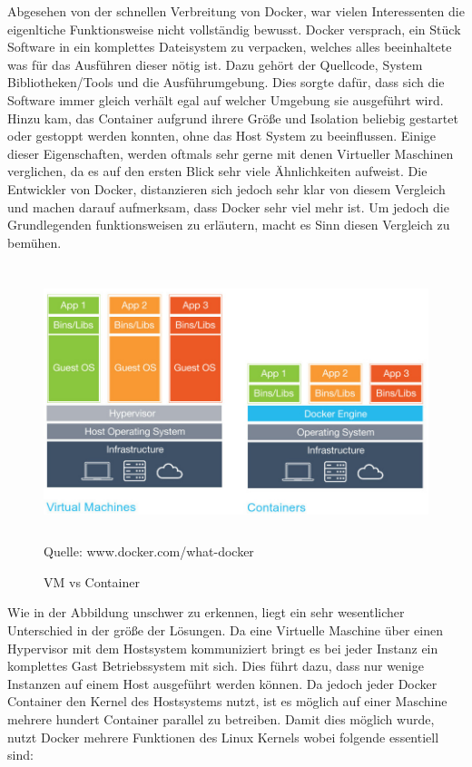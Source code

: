 \documentclass[12pt,toc=bib,toc=listof]{scrreprt}
\begin{document}
Abgesehen von der schnellen Verbreitung von Docker, war vielen Interessenten die eigenltiche Funktionsweise nicht vollständig bewusst.
Docker versprach, ein Stück Software in ein komplettes Dateisystem zu verpacken, welches alles beeinhaltete was für das Ausführen dieser  nötig ist. Dazu gehört der Quellcode, System Bibliotheken/Tools und die Ausführumgebung. Dies sorgte dafür, dass sich die Software immer gleich verhält egal auf welcher Umgebung sie ausgeführt wird. 
Hinzu kam, das Container aufgrund ihrere Größe und Isolation  beliebig gestartet oder gestoppt werden konnten, ohne das Host System zu beeinflussen.
Einige dieser Eigenschaften, werden oftmals sehr gerne mit denen Virtueller Maschinen verglichen, da es auf den ersten Blick sehr viele Ähnlichkeiten aufweist.
Die Entwickler von Docker, distanzieren sich jedoch sehr klar von diesem Vergleich und machen darauf aufmerksam, dass Docker sehr viel mehr ist.
Um jedoch die Grundlegenden funktionsweisen zu erläutern, macht es Sinn diesen Vergleich zu bemühen.

\begin{figure}
	\centering
	\caption{VM vs Container}
	\includegraphics[width=15cm, height=8cm, scale=0.3]{dockerVM.jpg}
	Quelle: www.docker.com/what-docker
\end{figure}

Wie in der Abbildung unschwer zu erkennen, liegt ein sehr wesentlicher Unterschied in der größe der Lösungen.
Da eine Virtuelle Maschine über einen Hypervisor mit dem Hostsystem kommuniziert bringt es bei jeder Instanz ein komplettes Gast Betriebssystem mit sich. Dies führt dazu, dass nur wenige Instanzen auf einem Host ausgeführt werden können.
Da jedoch jeder Docker Container den Kernel des Hostsystems nutzt, ist es möglich auf einer Maschine mehrere hundert Container parallel zu betreiben.
Damit dies möglich wurde, nutzt Docker mehrere Funktionen des Linux Kernels wobei folgende essentiell sind:
\end{document}
